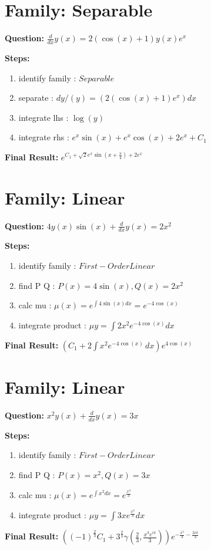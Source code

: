 \documentclass{article}
\begin{document}
\section*{Family: Separable}
\textbf{Question:} $\frac{d}{d x} y{\left(x \right)} = 2 \left(\cos{\left(x \right)} + 1\right) y{\left(x \right)} e^{x}$

\textbf{Steps:}
\begin{enumerate}
\item identify family :  $Separable$
\item separate :  $dy / (y) = (2 \left(\cos{\left(x \right)} + 1\right) e^{x}) dx$
\item integrate lhs :  $\log{\left(y \right)}$
\item integrate rhs :  $e^{x} \sin{\left(x \right)} + e^{x} \cos{\left(x \right)} + 2 e^{x} + C_1$
\end{enumerate}
\textbf{Final Result:} $e^{C_{1} + \sqrt{2} e^{x} \sin{\left(x + \frac{\pi}{4} \right)} + 2 e^{x}}$

\section*{Family: Linear}
\textbf{Question:} $4 y{\left(x \right)} \sin{\left(x \right)} + \frac{d}{d x} y{\left(x \right)} = 2 x^{2}$

\textbf{Steps:}
\begin{enumerate}
\item identify family :  $First-Order Linear$
\item find P Q :  $P(x)=4 \sin{\left(x \right)}, Q(x)=2 x^{2}$
\item calc mu :  $\mu(x) = e^{\int 4 \sin{\left(x \right)} dx} = e^{- 4 \cos{\left(x \right)}}$
\item integrate product :  $\mu y = \int 2 x^{2} e^{- 4 \cos{\left(x \right)}} dx$
\end{enumerate}
\textbf{Final Result:} $\left(C_{1} + 2 \int x^{2} e^{- 4 \cos{\left(x \right)}}\, dx\right) e^{4 \cos{\left(x \right)}}$

\section*{Family: Linear}
\textbf{Question:} $x^{2} y{\left(x \right)} + \frac{d}{d x} y{\left(x \right)} = 3 x$

\textbf{Steps:}
\begin{enumerate}
\item identify family :  $First-Order Linear$
\item find P Q :  $P(x)=x^{2}, Q(x)=3 x$
\item calc mu :  $\mu(x) = e^{\int x^{2} dx} = e^{\frac{x^{3}}{3}}$
\item integrate product :  $\mu y = \int 3 x e^{\frac{x^{3}}{3}} dx$
\end{enumerate}
\textbf{Final Result:} $\left(\left(-1\right)^{\frac{2}{3}} C_{1} + 3^{\frac{2}{3}} \gamma\left(\frac{2}{3}, \frac{x^{3} e^{i \pi}}{3}\right)\right) e^{- \frac{x^{3}}{3} - \frac{2 i \pi}{3}}$
\end{document}
